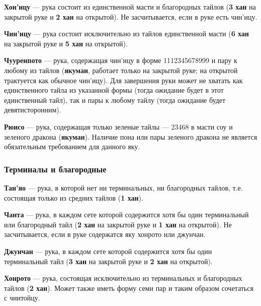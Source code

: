 \textbf{Хон'ицу} --- рука состоит из единственной масти и благородных тайлов (\textbf{3 хан} на закрытой руке и \textbf{2 хан} на открытой). Не засчитывается, если в руке есть чин'ицу.

 \hfill {}

\textbf{Чин'ицу} --- рука состоит исключительно из тайлов единственной масти (\textbf{6 хан} на закрытой руке и \textbf{5 хан} на открытой).

\textbf{Чууренпото} --- рука, содержащая чин'ицу в форме 1112345678999 и пару к любому из тайлов (\textbf{якуман}, работает только на закрытой руке; на открытой трактуется как обычное чин'ицу). Для завершения руки может не хватать как единственного тайла из указанной формы (тогда ожидание будет в этот единственный тайл), так и пары к любому тайлу (тогда ожидание будет девятисторонним).


\textbf{Рюисо} --- рука, содержащая только зеленые тайлы --- 23468 в масти соу и зеленого дракона (\textbf{якуман}). Наличие пона или пары зеленого дракона не является обязательным требованием для данного яку.

 \hfill {}

\subsubsection{Терминалы и благородные}

\textbf{Тан'яо} --- рука, в которой нет ни терминальных, ни благородных тайлов, т.е. состоящая только из средних тайлов (\textbf{1 хан}).

 \hfill {}

\textbf{Чанта} --- рука, в каждом сете которой содержится хотя бы один терминальный или благородный тайл (\textbf{2 хан} на закрытой руке и \textbf{1 хан} на открытой). Не засчитывается, если в руке содержатся яку хонрото или джунчан.

 \hfill {}

\textbf{Джунчан} --- рука, в каждом сете которой содержится хотя бы один терминальный тайл (\textbf{3 хан} на закрытой руке и \textbf{2 хан} на открытой).

 \hfill {}

\textbf{Хонрото} --- рука, состоящая исключительно из терминальных и благородных тайлов (\textbf{2 хан}). Может также иметь форму семи пар и таким образом сочетаться с чиитойцу.

